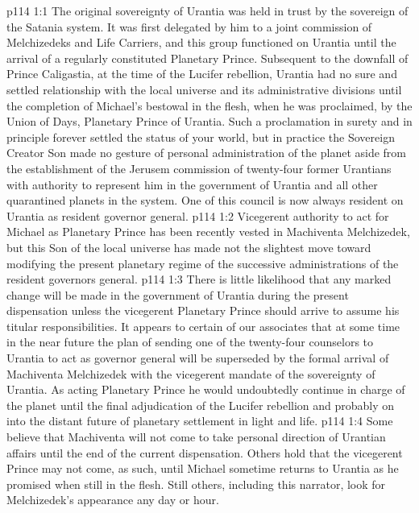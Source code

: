 \vs p114 1:1 The original sovereignty of Urantia was held in trust by the sovereign of the Satania system. It was first delegated by him to a joint commission of Melchizedeks and Life Carriers, and this group functioned on Urantia until the arrival of a regularly constituted Planetary Prince. Subsequent to the downfall of Prince Caligastia, at the time of the Lucifer rebellion, Urantia had no sure and settled relationship with the local universe and its administrative divisions until the completion of Michael’s bestowal in the flesh, when he was proclaimed, by the Union of Days, Planetary Prince of Urantia. Such a proclamation in surety and in principle forever settled the status of your world, but in practice the Sovereign Creator Son made no gesture of personal administration of the planet aside from the establishment of the Jerusem commission of twenty\hyp{}four former Urantians with authority to represent him in the government of Urantia and all other quarantined planets in the system. One of this council is now always resident on Urantia as resident governor general.\plusone
\vs p114 1:2 Vicegerent authority to act for Michael as Planetary Prince has been recently vested in Machiventa Melchizedek, but this Son of the local universe has made not the slightest move toward modifying the present planetary regime of the successive administrations of the resident governors general.
\vs p114 1:3 There is little likelihood that any marked change will be made in the government of Urantia during the present dispensation unless the vicegerent Planetary Prince should arrive to assume his titular responsibilities. It appears to certain of our associates that at some time in the near future the plan of sending one of the twenty\hyp{}four counselors to Urantia to act as governor general will be superseded by the formal arrival of Machiventa Melchizedek with the vicegerent mandate of the sovereignty of Urantia. As acting Planetary Prince he would undoubtedly continue in charge of the planet until the final adjudication of the Lucifer rebellion and probably on into the distant future of planetary settlement in light and life.
\vs p114 1:4 Some believe that Machiventa will not come to take personal direction of Urantian affairs until the end of the current dispensation. Others hold that the vicegerent Prince may not come, as such, until Michael sometime returns to Urantia as he promised when still in the flesh. Still others, including this narrator, look for Melchizedek’s appearance any day or hour.
